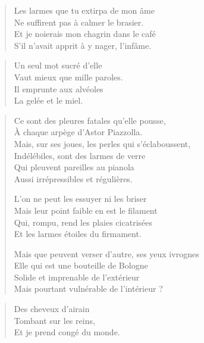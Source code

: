 \begin{verse}
Les larmes que tu extirpa de mon âme\\
Ne suffirent pas à calmer le brasier.\\
Et je noierais mon chagrin dans le café\\
S’il n’avait apprit à y nager, l’infâme.
\end{verse}

\begin{verse}
Un seul mot sucré d’elle\\
Vaut mieux que mille paroles.\\
Il emprunte aux alvéoles\\
La gelée et le miel.
\end{verse}

\begin{verse}
Ce sont des pleures fatales qu’elle pousse,\\
À chaque arpège d’Astor Piazzolla.\\
Mais, sur ses joues, les perles qui s’éclaboussent,\\
Indélébiles, sont des larmes de verre\\
Qui pleuvent pareilles au pianola\\
Aussi irrépressibles et régulières.

L’on ne peut les essuyer ni les briser\\
Mais leur point faible en est le filament\\
Qui, rompu, rend les plaies cicatrisées\\
Et les larmes étoiles du firmament.

Mais que peuvent verser d’autre, ses yeux ivrognes\\
Elle qui est une bouteille de Bologne\\
Solide et imprenable de l’extérieur\\
Mais pourtant vulnérable de l’intérieur ?
\end{verse}

\begin{verse}
Des cheveux d’airain\\
Tombant sur les reins,\\
Et je prend congé du monde.
\end{verse}



